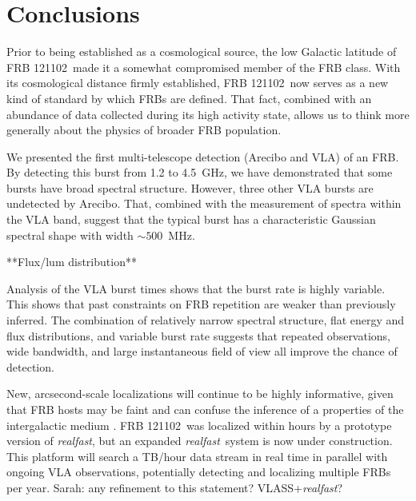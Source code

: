\documentclass[twocolumn]{aastex61}
\newcommand{\rf}{\emph{realfast}}
\newcommand{\frb}{FRB 121102}
\begin{document}
\section{Conclusions}
Prior to being established as a cosmological source, the low Galactic latitude of \frb\ made it a somewhat compromised member of the FRB class. With its cosmological distance firmly established, \frb\ now serves as a new kind of standard by which FRBs are defined. That fact, combined with an abundance of data collected during its high activity state, allows us to think more generally about the physics of broader FRB population.

We presented the first multi-telescope detection (Arecibo and VLA) of an FRB. By detecting this burst from 1.2 to 4.5~GHz, we have demonstrated that some bursts have broad spectral structure. However, three other VLA bursts are undetected by Arecibo. That, combined with the measurement of spectra within the VLA band, suggest that the typical burst has a characteristic Gaussian spectral shape with width $\sim500$\ MHz.

**Flux/lum distribution**

Analysis of the VLA burst times shows that the burst rate is highly variable. This shows that past constraints on FRB repetition are weaker than previously inferred. The combination of relatively narrow spectral structure, flat energy and flux distributions, and variable burst rate suggests that repeated observations, wide bandwidth, and large instantaneous field of view all improve the chance of detection. 

New, arcsecond-scale localizations will continue to be highly informative, given that FRB hosts may be faint and can confuse the inference of a properties of the intergalactic medium \citep{2014ApJ...783L..35D}. \frb\ was localized within hours by a prototype version of \rf, but an expanded \rf\ system is now under construction. This platform will search a TB/hour data stream in real time in parallel with ongoing VLA observations, potentially detecting and localizing multiple FRBs per year. {\color{red} Sarah: any refinement to this statement?} VLASS+\rf?


\end{document}
